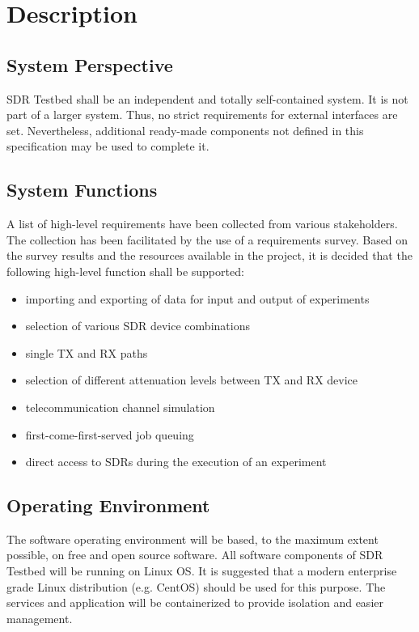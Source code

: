 \documentclass[english,titlepage,a4paper]{report}
\begin{document}
\chapter{Description}
\section{System Perspective}

SDR Testbed shall be an independent and totally self-contained system.
It is not part of a larger system.
Thus, no strict requirements for external interfaces are set.
Nevertheless, additional ready-made components not defined in this specification may be used to complete it.

\section{System Functions}

A list of high-level requirements have been collected from various stakeholders.
The collection has been facilitated by the use of a requirements survey.
Based on the survey results and the resources available in the project, it is decided that the following high-level function shall be supported:
\begin{itemize}
\item importing and exporting of data for input and output of experiments
\item selection of various SDR device combinations
\item single TX and RX paths
\item selection of different attenuation levels between TX and RX device
\item telecommunication channel simulation
\item first-come-first-served job queuing
\item direct access to SDRs during the execution of an experiment
\end{itemize}

\section{Operating Environment}

The software operating environment will be based, to the maximum extent possible, on free and open source software.
All software components of SDR Testbed will be running on Linux OS.
It is suggested that a modern enterprise grade Linux distribution (e.g. CentOS) should be used for this purpose.
The services and application will be containerized to provide isolation and easier management.
\end{document}
